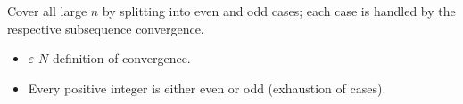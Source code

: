 \begin{remark*}
Cover all large $n$ by splitting into even and odd cases; each case is handled by the respective subsequence convergence.
\end{remark*}

\begin{remark*}[Dependencies]
\begin{itemize}
  \item $\varepsilon$-$N$ definition of convergence.
  \item Every positive integer is either even or odd (exhaustion of cases).
\end{itemize}
\end{remark*}
